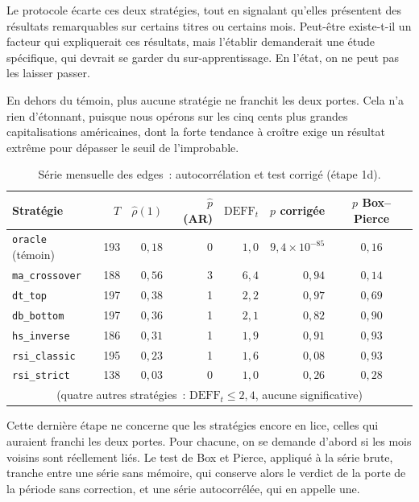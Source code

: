 Le protocole écarte ces deux stratégies, tout en signalant qu'elles présentent
des résultats remarquables sur certains titres ou certains mois. Peut-être
existe-t-il un facteur qui expliquerait ces résultats, mais l'établir
demanderait une étude spécifique, qui devrait se garder du sur-apprentissage.
En l'état, on ne peut pas les laisser passer.

En dehors du témoin, plus aucune stratégie ne franchit les deux portes. Cela
n'a rien d'étonnant, puisque nous opérons sur les cinq cents plus grandes
capitalisations américaines, dont la forte tendance à croître exige un
résultat extrême pour dépasser le seuil de l'improbable.



\begin{table}[H]
\centering
\caption{Série mensuelle des edges~: autocorrélation et test corrigé (étape 1d).}
\label{tab:b1-dep-mensuel}
\small
\begin{tabular}{@{}lrrrrrc@{}}
\toprule
Stratégie & $T$ & $\hat\rho(1)$ & $\hat p$ (AR) & $\mathrm{DEFF}_t$ & $p$ corrigée & $p$ Box--Pierce \\
\midrule
\texttt{oracle} (témoin) & 193 & $0{,}18$ & 0 & $1{,}0$ & $9{,}4\times10^{-85}$ & $0{,}16$ \\
\midrule
\texttt{ma\_crossover} & 188 & $0{,}56$ & 3 & $6{,}4$ & $0{,}94$ & $0{,}14$ \\
\texttt{dt\_top}       & 197 & $0{,}38$ & 1 & $2{,}2$ & $0{,}97$ & $0{,}69$ \\
\texttt{db\_bottom}    & 197 & $0{,}36$ & 1 & $2{,}1$ & $0{,}82$ & $0{,}90$ \\
\texttt{hs\_inverse}   & 186 & $0{,}31$ & 1 & $1{,}9$ & $0{,}91$ & $0{,}93$ \\
\texttt{rsi\_classic}  & 195 & $0{,}23$ & 1 & $1{,}6$ & $0{,}08$ & $0{,}93$ \\
\texttt{rsi\_strict}   & 138 & $0{,}03$ & 0 & $1{,}0$ & $0{,}26$ & $0{,}28$ \\
\multicolumn{7}{c}{\footnotesize (quatre autres stratégies~: $\mathrm{DEFF}_t \le 2{,}4$, aucune significative)} \\
\bottomrule
\end{tabular}
\end{table}
Cette dernière étape ne concerne que les stratégies encore en lice, celles qui
auraient franchi les deux portes. Pour chacune, on se demande d'abord si les
mois voisins sont réellement liés. Le test de Box et Pierce, appliqué à la
série brute, tranche entre une série sans mémoire, qui conserve alors le
verdict de la porte de la période sans correction, et une série autocorrélée,
qui en appelle une.

